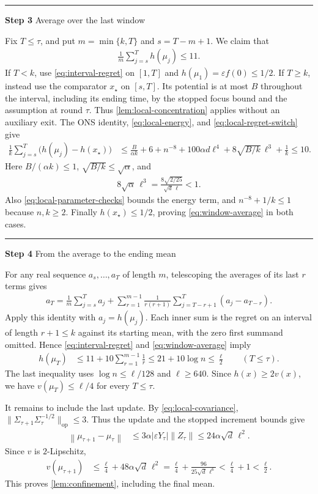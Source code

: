 \documentclass{article}
\newcommand{\proofstep}[2]{%
    \par\medskip
    \noindent
    \textcolor{blue!55!black}{\rule{2pt}{1.2em}}%
    \hspace{0.6em}%
    {\sffamily\bfseries\color{blue!55!black}Step #1}%
    \quad
    {\sffamily #2}%
    \par\smallskip
}
\newcommand{\op}{\mathrm{op}}
\newcommand{\1}{\mathbf 1}
\newcommand{\eps}{\varepsilon}
\newcommand{\norm}[1]{\left\lVert #1\right\rVert}
\begin{document}
\proofstep{3}{Average over the last window}
Fix $T\leq\tau$, and put $m=\min\{k,T\}$ and $s=T-m+1$. We claim that
\begin{align}
    \frac1m\sum_{j=s}^T h(\mu_j)\leq11.
    \label{eq:window-average}
\end{align}
If $T<k$, use \eqref{eq:interval-regret} on $[1,T]$ and
$h(\mu_1)=\eps f(0)\leq1/2$.
If $T\geq k$, instead use the comparator $x_\star$ on $[s,T]$.
Its potential is at most $B$ throughout the interval, including its
ending time, by the stopped focus bound and the assumption at round
$\tau$. Thus \cref{lem:local-concentration} applies without an auxiliary
exit. The ONS identity, \eqref{eq:local-energy}, and
\eqref{eq:local-regret-switch} give
\begin{align}
    \frac1k\sum_{j=s}^T\bigl(h(\mu_j)-h(x_\star)\bigr)
     & \leq\frac{B}{\alpha k}+6+n^{-8}
    +100\alpha d\ell^4
    +8\sqrt{B/k}\,\ell^3+\frac1k
    \leq10.
\end{align}
Here $B/(\alpha k)\leq1$, $\sqrt{B/k}\leq\sqrt\alpha$, and
\begin{align}
    8\sqrt\alpha\,\ell^3
    =\frac{8\sqrt{2/25}}{\sqrt d\,\ell}<1.
\end{align}
Also \eqref{eq:local-parameter-checks} bounds the energy term, and
$n^{-8}+1/k\leq1$ because $n,k\geq2$.
Finally $h(x_\star)\leq1/2$, proving \eqref{eq:window-average} in both
cases.

\proofstep{4}{From the average to the ending mean}
For any real sequence $a_s,\ldots,a_T$ of length $m$, telescoping the
averages of its last $r$ terms gives
\begin{align}
    a_T
    =\frac1m\sum_{j=s}^T a_j
    +\sum_{r=1}^{m-1}\frac1{r(r+1)}
    \sum_{j=T-r+1}^T(a_j-a_{T-r}).
    \label{eq:suffix-average-identity}
\end{align}
Apply this identity with $a_j=h(\mu_j)$. Each inner sum is the regret on
an interval of length $r+1\leq k$ against its starting mean, with the
zero first summand omitted. Hence \eqref{eq:interval-regret} and
\eqref{eq:window-average} imply
\begin{align}
    h(\mu_T)
     & \leq11+10\sum_{r=1}^{m-1}\frac1r
    \leq21+10\log n
    \leq\frac\ell2
    \qquad(T\leq\tau).
    \label{eq:last-iterate-extension}
\end{align}
The last inequality uses $\log n\leq\ell/128$ and $\ell\geq640$.
Since $h(x)\geq2v(x)$, we have $v(\mu_T)\leq\ell/4$ for every
$T\leq\tau$.

It remains to include the last update. By \eqref{eq:local-covariance},
$\|\Sigma_{\tau+1}\Sigma_\tau^{-1/2}\|_{\op}\leq3$.
Thus the update and the stopped increment bounds give
\begin{align}
    \norm{\mu_{\tau+1}-\mu_\tau}
     & \leq3\alpha|\eps Y_\tau|\norm{Z_\tau}
    \leq24\alpha \sqrt d\,\ell^2.
\end{align}
Since $v$ is $2$-Lipschitz,
\begin{align}
    v(\mu_{\tau+1})
     & \leq\frac\ell4+48\alpha \sqrt d\,\ell^2
    =\frac\ell4+\frac{96}{25\sqrt d\,\ell^6}
    <\frac\ell4+1<\frac\ell2.
\end{align}
This proves \cref{lem:confinement}, including the final mean.
\end{document}

